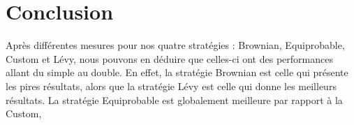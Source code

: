 \section{Conclusion}

Après différentes mesures pour nos quatre stratégies : Brownian,
Equiprobable, Custom et Lévy, nous pouvons en déduire que celles-ci
ont des performances allant du simple au double. En effet, la
stratégie Brownian est celle qui présente les pires résultats,
alors que la stratégie Lévy est celle qui donne les meilleurs
résultats. La stratégie Equiprobable est globalement meilleure par
rapport à la Custom,
